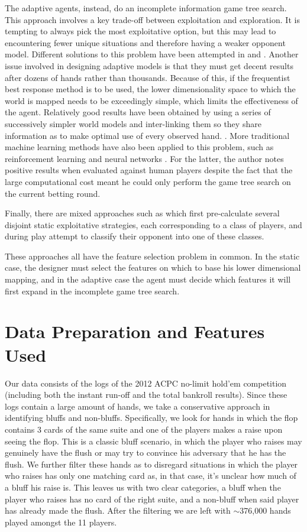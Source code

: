 \documentclass[letterpaper]{article}
\begin{document}
The adaptive agents, instead, do an incomplete information game tree search. This approach involves a key trade-off between exploitation and exploration. It is tempting to always pick the most exploitative option, but this may lead to encountering fewer unique situations and therefore having a weaker opponent model. Different solutions to this problem have been attempted in  \cite{P6} and  \cite{P7}. Another issue involved in designing adaptive models is that they must get decent results after dozens of hands rather than thousands. Because of this, if the frequentist best response method is to be used, the lower dimensionality space to which the world is mapped needs to be exceedingly simple, which limits the effectiveness of the agent. Relatively good results have been obtained by using a series of successively simpler world models and inter-linking them so they share information as to make optimal use of every observed hand.  \cite{P6,P8}. More traditional machine learning methods have also been applied to this problem, such as reinforcement learning \cite{P13} and neural networks \cite{P9}. For the latter, the author notes positive results when evaluated against human players despite the fact that the large computational cost meant he could only perform the game tree search on the current betting round.

Finally, there are mixed approaches such as  \cite{P10} which first pre-calculate several disjoint static exploitative strategies, each corresponding to a class of players, and during play attempt to classify their opponent into one of these classes.

These approaches all have the feature selection problem in common. In the static case, the designer must select the features on which to base his lower dimensional mapping, and in the adaptive case the agent must decide which features it will first expand in the incomplete game tree search.

\section{
\fontsize{12pt}{15pt} 
\selectfont
Data Preparation and Features Used}
\fontsize{10pt}{12pt} 
\selectfont
Our data consists of the logs of the 2012 ACPC no-limit hold'em competition (including both the instant run-off and the total bankroll results). Since these logs contain a large amount of hands, we take a conservative approach in identifying bluffs and non-bluffs. Specifically, we look for hands in which the flop contains 3 cards of the same suite and one of the players makes a raise upon seeing the flop. This is a classic bluff scenario, in which the player who raises may genuinely have the flush or may try to convince his adversary that he has the flush. We further filter these hands as to disregard situations in which the player who raises has only one matching card as, in that case, it's unclear how much of a bluff his raise is. This leaves us with two clear categories, a bluff when the player who raises has no card of the right suite, and a non-bluff when said player has already made the flush. After the filtering we are left with $\sim$376,000 hands played amongst the 11 players.
\end{document}
